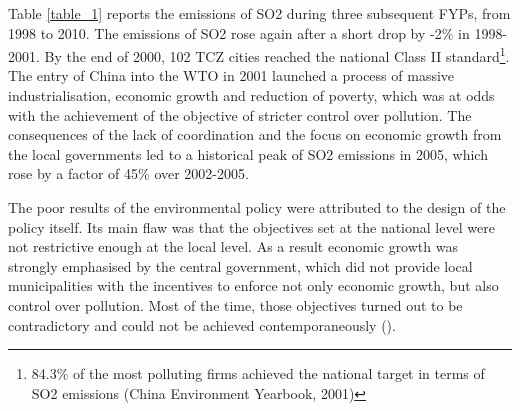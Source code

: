 \documentclass[12pt]{article}
\begin{document}
Table \ref{table_1} reports the emissions of SO2 during three subsequent FYPs, from 1998 to 2010. The emissions of SO2 rose again after a short drop by -2$\%$ in 1998-2001. By the end of 2000, 102 TCZ cities reached the national Class II standard\footnote{ 84.3$\%$ of the most polluting firms achieved the national target in terms of SO2 emissions (China Environment Yearbook, 2001)}. The entry of China into the WTO in 2001 launched a process of massive industrialisation, economic growth and reduction of poverty, which was at odds with the achievement of the objective of stricter control over pollution. The consequences of the lack of coordination and the focus on economic growth from the local governments led to a historical peak of SO2 emissions in 2005, which rose by a factor of 45$\%$  over 2002-2005.


The poor results of the environmental policy were attributed to the design of the policy itself. Its main flaw was that the objectives set at the national level were not restrictive enough at the local level. As a result economic growth was strongly emphasised by the central government, which did not provide local municipalities with the incentives to enforce not only economic growth, but also control over pollution. Most of the time, those objectives turned out to be contradictory and could not be achieved contemporaneously (\cite{Barbier2019-ce,Brajer2011-wc,Grossman1995-fb,Lee2015-pw}).
\end{document}

